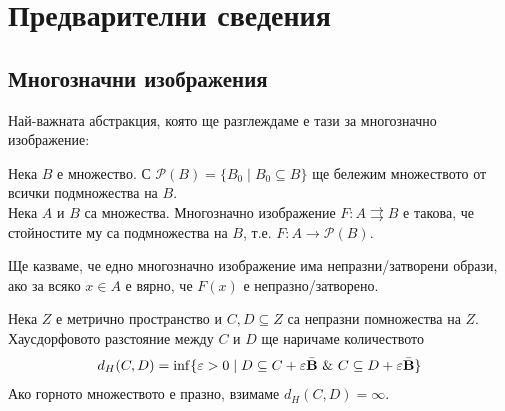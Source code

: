\chapter{Предварителни сведения}

\section{Многозначни изображения}
Най-важната абстракция, която ще разглеждаме е тази за многозначно изображение:

\begin{definition}
    Нека $B$ е множество. С $\mathcal{P}(B)=\{B_0 \mid B_0\subseteq B\}$ ще бележим множеството от всички подмножества на $B$.\\
    Нека $A$ и $B$ са множества. Многозначно изображение $F:A\rightrightarrows B$ е такова, че стойностите му са подмножества на $B$, т.е. $F:A\to\mathcal{P}(B)$.
\end{definition}

\begin{definition}
    Ще казваме, че едно многозначно изображение има непразни/затворени образи, ако за всяко $x\in A$ е вярно, че $F(x)$ е непразно/затворено.
\end{definition}

\begin{definition}
    Нека $Z$ е метрично пространство и $C,D\subseteq Z$ са непразни помножества на $Z$. Хаусдорфовото разстояние между $C$ и $D$ ще наричаме количеството
\[
    d_H(C,D) = \inf\{\varepsilon > 0  \mid D \subseteq C + \varepsilon\bar{\Ball}\ \&\ C \subseteq D+\varepsilon\bar{\Ball}\}
\]
    Ако горното множеството е празно, взимаме $d_H(C,D)=\infty$.
\end{definition}

